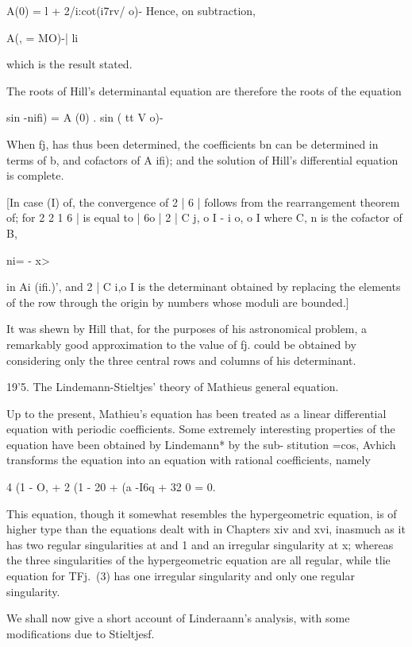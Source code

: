 A(0) = l + 2/i:cot(i7rv/ o)- Hence, on subtraction,

A(, = MO)-| li

which is the result stated.

The roots of Hill's determinantal equation are therefore the roots of
the equation

sin -nifi) = A (0) . sin ( tt V o)-

When fj, has thus been determined, the coefficients bn can be
determined in terms of b, and cofactors of A ifi); and the solution
of Hill's differential equation is complete.

%
%

[In case (I) of, the convergence of 2 | 6 | follows from the
rearrangement theorem of; for 2 2 1 6 | is equal to | 6o | 2 |
C j, o I - i o, o I where C, n is the cofactor of B,

ni= - x>

in Ai (ifi.)', and 2 | C i,o I is the determinant obtained by
replacing the elements of the row through the origin by numbers whose
moduli are bounded.]

It was shewn by Hill that, for the purposes of his astronomical
problem, a remarkably good approximation to the value of fj. could be
obtained by considering only the three central rows and columns of his
determinant.

19'5. The Lindemann-Stieltjes' theory of Mathieus general equation.

Up to the present, Mathieu's equation has been treated as a linear
differential equation with periodic coefficients. Some extremely
interesting properties of the equation have been obtained by
Lindemann* by the sub- stitution =cos, Avhich transforms the equation
into an equation with rational coefficients, namely

4 (1 - O, + 2 (1 - 20 + (a -I6q + 32 0 = 0.

This equation, though it somewhat resembles the hypergeometric
equation, is of higher type than the equations dealt with in Chapters
xiv and xvi, inasmuch as it has two regular singularities at and 1 and
an irregular singularity at x; whereas the three singularities of the
hypergeometric equation are all regular, while tlie equation for TFj.\
(3) has one irregular singularity and only one regular singularity.

We shall now give a short account of Linderaann's analysis, with some
modifications due to Stieltjesf.


